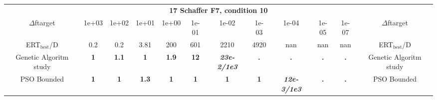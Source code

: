 \begin{tabular}{cccccccccccc}
 & \multicolumn{10}{c}{{\normalsize \textbf{17 Schaffer F7, condition 10}}}\\
$\Delta$ftarget& 1e+03& 1e+02& 1e+01& 1e+00& 1e-01& 1e-02& 1e-03& 1e-04& 1e-05& 1e-07 & $\Delta$ftarget \\
ERT$_{\textrm{best}}$/D& 0.2& 0.2& 3.81& 200& 601& 2210& 4920& nan& nan& nan & ERT$_{\textrm{best}}$/D \\
\hline
Genetic Algoritm study & \textbf{1} & \textbf{1.1} & \textbf{1} & \textbf{1.9} & \textbf{12} & \textbf{\textit{23e-2}\textit{/1e3}} & \textbf{.} & \textbf{.} & \textbf{.} & \textbf{.} & Genetic Algoritm study \cite{add_an_entry_for_Genetic Algoritm study_in_bbob.bib}\\
PSO Bounded & \textbf{1} & \textbf{1} & \textbf{1.3} & \textbf{1} & \textbf{1} & \textbf{1} & \textbf{1} & \textbf{\textit{12e-3}\textit{/1e3}} & \textbf{.} & \textbf{.} & PSO Bounded \cite{add_an_entry_for_PSO Bounded_in_bbob.bib}
\end{tabular}
